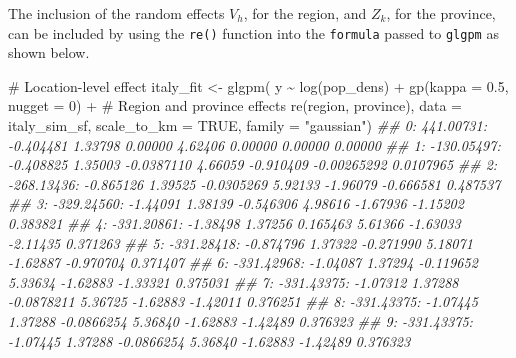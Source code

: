 \documentclass[
  letterpaper,
]{krantz}
\newenvironment{Shaded}{\begin{snugshade}}{\end{snugshade}}
\newcommand{\AttributeTok}[1]{\textcolor[rgb]{0.40,0.45,0.13}{#1}}
\newcommand{\CommentTok}[1]{\textcolor[rgb]{0.37,0.37,0.37}{#1}}
\newcommand{\ConstantTok}[1]{\textcolor[rgb]{0.56,0.35,0.01}{#1}}
\newcommand{\DecValTok}[1]{\textcolor[rgb]{0.68,0.00,0.00}{#1}}
\newcommand{\DocumentationTok}[1]{\textcolor[rgb]{0.37,0.37,0.37}{\textit{#1}}}
\newcommand{\FloatTok}[1]{\textcolor[rgb]{0.68,0.00,0.00}{#1}}
\newcommand{\FunctionTok}[1]{\textcolor[rgb]{0.28,0.35,0.67}{#1}}
\newcommand{\NormalTok}[1]{\textcolor[rgb]{0.00,0.23,0.31}{#1}}
\newcommand{\OtherTok}[1]{\textcolor[rgb]{0.00,0.23,0.31}{#1}}
\newcommand{\SpecialCharTok}[1]{\textcolor[rgb]{0.37,0.37,0.37}{#1}}
\newcommand{\StringTok}[1]{\textcolor[rgb]{0.13,0.47,0.30}{#1}}
\begin{document}
The inclusion of the random effects \(V_h\), for the region, and
\(Z_k\), for the province, can be included by using the \texttt{re()}
function into the \texttt{formula} passed to \texttt{glgpm} as shown
below.

\begin{Shaded}
\begin{Highlighting}[]

                        \CommentTok{\# Location{-}level effect}
\NormalTok{italy\_fit }\OtherTok{\textless{}{-}} \FunctionTok{glgpm}\NormalTok{( y }\SpecialCharTok{\textasciitilde{}} \FunctionTok{log}\NormalTok{(pop\_dens) }\SpecialCharTok{+} \FunctionTok{gp}\NormalTok{(}\AttributeTok{kappa =} \FloatTok{0.5}\NormalTok{, }\AttributeTok{nugget =} \DecValTok{0}\NormalTok{) }\SpecialCharTok{+}
                        \CommentTok{\# Region and province effects}
                        \FunctionTok{re}\NormalTok{(region, province),}
         \AttributeTok{data =}\NormalTok{ italy\_sim\_sf, }\AttributeTok{scale\_to\_km =} \ConstantTok{TRUE}\NormalTok{,}
         \AttributeTok{family =} \StringTok{"gaussian"}\NormalTok{)}
\DocumentationTok{\#\#   0:     441.00731: {-}0.404481  1.33798  0.00000  4.62406  0.00000  0.00000  0.00000}
\DocumentationTok{\#\#   1:    {-}130.05497: {-}0.408825  1.35003 {-}0.0387110  4.66059 {-}0.910409 {-}0.00265292 0.0107965}
\DocumentationTok{\#\#   2:    {-}268.13436: {-}0.865126  1.39525 {-}0.0305269  5.92133 {-}1.96079 {-}0.666581 0.487537}
\DocumentationTok{\#\#   3:    {-}329.24560: {-}1.44091  1.38139 {-}0.546306  4.98616 {-}1.67936 {-}1.15202 0.383821}
\DocumentationTok{\#\#   4:    {-}331.20861: {-}1.38498  1.37256 0.165463  5.61366 {-}1.63033 {-}2.11435 0.371263}
\DocumentationTok{\#\#   5:    {-}331.28418: {-}0.874796  1.37322 {-}0.271990  5.18071 {-}1.62887 {-}0.970704 0.371407}
\DocumentationTok{\#\#   6:    {-}331.42968: {-}1.04087  1.37294 {-}0.119652  5.33634 {-}1.62883 {-}1.33321 0.375031}
\DocumentationTok{\#\#   7:    {-}331.43375: {-}1.07312  1.37288 {-}0.0878211  5.36725 {-}1.62883 {-}1.42011 0.376251}
\DocumentationTok{\#\#   8:    {-}331.43375: {-}1.07445  1.37288 {-}0.0866254  5.36840 {-}1.62883 {-}1.42489 0.376323}
\DocumentationTok{\#\#   9:    {-}331.43375: {-}1.07445  1.37288 {-}0.0866254  5.36840 {-}1.62883 {-}1.42489 0.376323}


\end{Highlighting}
\end{Shaded}
\end{document}
